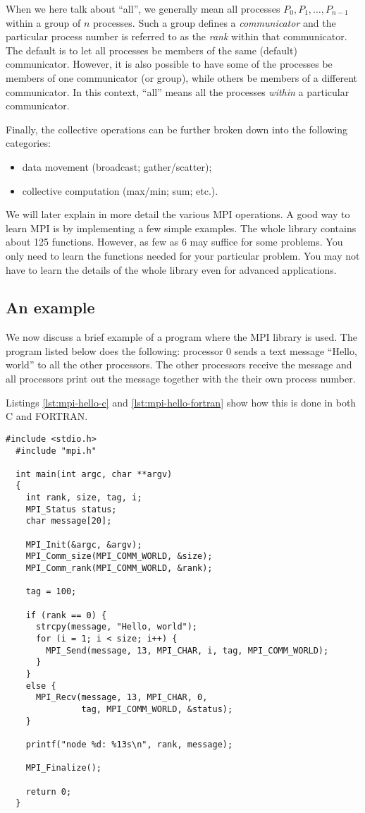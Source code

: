 When we here talk about ``all'', we generally mean all processes $P_0, P_1,
\ldots, P_{n-1}$ within a group of $n$ processes. Such a group defines a
\emph{communicator} and the particular process number is referred to as the
\emph{rank} within that communicator. The default is to let all processes be
members of the same (default) communicator. However, it is also possible to have
some of the processes be members of one communicator (or group), while others be
members of a different communicator. In this context, ``all'' means all the
processes \emph{within} a particular communicator.

Finally, the collective operations can be further broken down into the
following categories:
\begin{itemize}
\item data movement (broadcast; gather/scatter);
\item collective computation (max/min; sum; etc.).
\end{itemize}

We will later explain in more detail the various MPI operations. A good way to
learn MPI is by implementing a few simple examples. The whole library contains
about 125 functions. However, as few as 6 may suffice for some problems. You
only need to learn the functions needed for your particular problem. You may not
have to learn the details of the whole library even for advanced applications.

\subsection{An example}

We now discuss a brief example of a program where the MPI library is used. The
program listed below does the following: processor 0 sends a text message
``Hello, world'' to all the other processors. The other processors receive the
message and all processors print out the message together with the their own
process number.

Listings \ref{lst:mpi-hello-c} and \ref{lst:mpi-hello-fortran} show how this is
done in both C and FORTRAN.

\begin{lstlisting}[style=c, float, caption={Hello world MPI in C.}, label=lst:mpi-hello-c]
  #include <stdio.h>
  #include "mpi.h"

  int main(int argc, char **argv)
  {
    int rank, size, tag, i;
    MPI_Status status;
    char message[20];

    MPI_Init(&argc, &argv);
    MPI_Comm_size(MPI_COMM_WORLD, &size);
    MPI_Comm_rank(MPI_COMM_WORLD, &rank);

    tag = 100;

    if (rank == 0) {
      strcpy(message, "Hello, world");
      for (i = 1; i < size; i++) {
        MPI_Send(message, 13, MPI_CHAR, i, tag, MPI_COMM_WORLD);
      }
    }
    else {
      MPI_Recv(message, 13, MPI_CHAR, 0,
               tag, MPI_COMM_WORLD, &status);
    }

    printf("node %d: %13s\n", rank, message);

    MPI_Finalize();

    return 0;
  }
\end{lstlisting}

